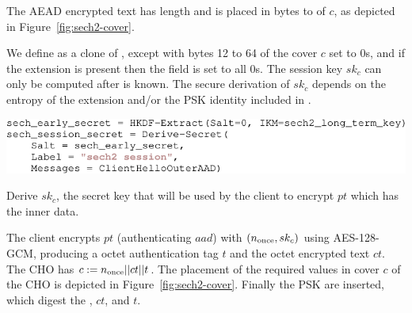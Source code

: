 The \ac{AEAD} encrypted text has length \sechtwocipherlen{} and is placed in bytes \sechtwocipheroffset{}  to \sechtwocipherend{} of $c$, as depicted in Figure~\ref{fig:sech2-cover}.


We define  as a clone of , except with bytes 12 to 64 of the cover $c$ set to 0s, and if the  extension is present then the  field is set to all 0s.
The session key $sk_c$ can only be computed after  is known.
The secure derivation of $sk_c$ depends on the entropy of the  extension and/or the \ac{PSK} identity included in .


\begin{listing}[htb]
\centering
\includegraphics[width=\linewidth]{figure/sech2-derive-secret.pdf}
\captionsetup{width=.8\linewidth} 
\caption[SECH 2 Derive Secret]{Derive $sk_c$, the secret key that will be used by the client to encrypt $pt$ which has the inner  data.}
\label{lst:sech2-derive-secret}
\end{listing}

The client encrypts $pt$ (authenticating $aad$) with $(\nonce,sk_c)$ using AES-128-GCM, producing a \sechtwotaglen{} octet authentication tag $t$ and the \sechtwocipherlen{} octet encrypted text $ct$. The \ac{CHO} has $c:=\nonce||ct||t$. The placement of the required values in cover $c$ of the \ac{CHO} is depicted in Figure~\ref{fig:sech2-cover}.
Finally the \ac{PSK}  are inserted, which digest the \nonce, $ct$, and $t$.


